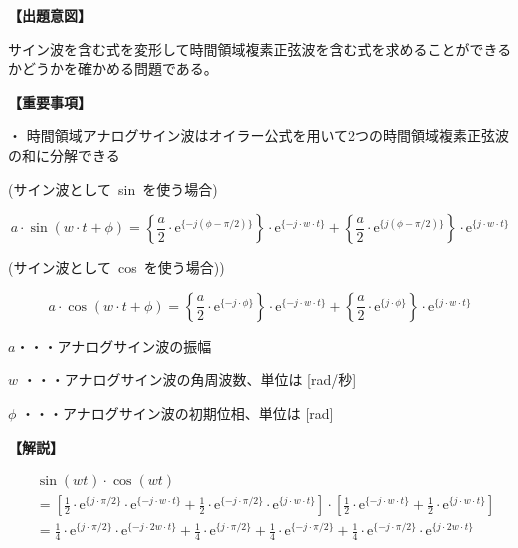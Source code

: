 \noindent \textbf{【出題意図】}

\bigskip
\noindent サイン波を含む式を変形して時間領域複素正弦波を含む式を求めることができるかどうかを確かめる問題である。

\vspace{1em}
\noindent \textbf{【重要事項】}

\medskip
\noindent ・ 時間領域アナログサイン波はオイラー公式を用いて2つの時間領域複素正弦波の和に分解できる

\medskip
\noindent \mbox{(サイン波として sin を使う場合)}

\[
a \cdot \sin ( w \cdot t + \phi )
=  \left \{ \frac{a}{2} \cdot \textrm{e}^{\{-j (\phi-\pi/2) \}} \right \} \cdot \textrm{e}^{\{-j \cdot w \cdot t \}}
+  \left \{ \frac{a}{2} \cdot \textrm{e}^{\{j (\phi-\pi/2) \}} \right \} \cdot \textrm{e}^{\{j \cdot w \cdot t \}}
\]

\medskip
\noindent \mbox{(サイン波として cos を使う場合))}

\[
a \cdot \cos ( w \cdot t + \phi )
=  \left \{ \frac{a}{2} \cdot \textrm{e}^{\{-j \cdot \phi \}} \right \} \cdot \textrm{e}^{\{-j \cdot w \cdot t \}}
+  \left \{ \frac{a}{2} \cdot \textrm{e}^{\{j  \cdot \phi \}} \right \} \cdot \textrm{e}^{\{j \cdot w \cdot t \}}
\]

\bigskip
\noindent  $a$・・・アナログサイン波の振幅

\bigskip
\noindent $w$ ・・・アナログサイン波の角周波数、単位は [rad/秒]

\bigskip
\noindent $\phi$ ・・・アナログサイン波の初期位相、単位は [rad]

\bigskip

\vspace{0.5em}
\noindent \textbf{【解説】}

\begin{align*}
& \sin (wt) \cdot \cos (wt) \\
&=
\left [
  \frac{1}{2} \cdot \textrm{e}^{\{ j \cdot \pi/2 \}} \cdot \textrm{e}^{\{-j \cdot w \cdot t \}} 
+ \frac{1}{2} \cdot \textrm{e}^{\{-j \cdot \pi/2 \}} \cdot \textrm{e}^{\{ j \cdot w \cdot t \}} 
\right ]
\cdot
\left [
  \frac{1}{2} \cdot \textrm{e}^{\{-j \cdot w \cdot t \}} 
+ \frac{1}{2} \cdot \textrm{e}^{\{ j \cdot w \cdot t \}} 
\right ]  \\
&=
 \frac{1}{4} \cdot \textrm{e}^{\{ j \cdot \pi/2 \}} \cdot \textrm{e}^{\{-j \cdot 2w \cdot t \}} 
+\frac{1}{4}\cdot\textrm{e}^{\{ j \cdot \pi/2 \}}
+\frac{1}{4}\cdot\textrm{e}^{\{-j \cdot \pi/2 \}}
+\frac{1}{4} \cdot \textrm{e}^{\{-j \cdot \pi/2 \}} \cdot \textrm{e}^{\{ j \cdot 2w \cdot t \}} 
\end{align*}
